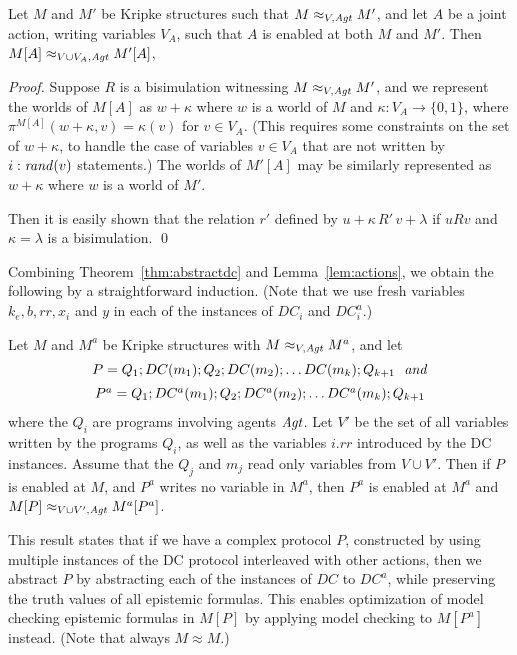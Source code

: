 \documentclass[]{llncs}
\newcommand{\rand}{{\it rand}}
\newcommand{\Agt}{{\it Agt}}
\begin{document}
\begin{lemma} \label{lem:actions} 
Let $M$ and $M'$ be Kripke structures such that $M\approx_{V,\Agt} M'$, and 
let $A$ be a joint action, writing variables $V_A$, such that $A$ is enabled at both $M$ and $M'$. 
Then $M[A] \approx_{V\cup V_A,\Agt} M'[A]$,
\end{lemma} 
\begin{proof} 
Suppose $R$ is a bisimulation witnessing $M\approx_{V,\Agt} M'$, 
and we represent the worlds of $M[A]$
as $w+\kappa$ where $w$ is a  world of $M$ 
and $\kappa: V_A \rightarrow \{0,1\}$, where 
$\pi^{M[A]}(w + \kappa,v) =  \kappa(v)$ for $v\in V_A$. 
(This requires some constraints on the set of $w+\kappa$, to handle the case of 
variables $v\in V_A$ that are not written by $i:\rand(v)$ statements.) 
The worlds of $M'[A]$ may be similarly represented as $w+\kappa$ where $w$ is a world of $M'$. 

Then it is easily shown that the  relation $r'$ defined by 
$u+\kappa \,R'\, v+\lambda$ if $uRv$ and $\kappa = \lambda$ 
is a bisimulation.  \qed
\end{proof} 


Combining Theorem~\ref{thm:abstractdc} and Lemma~\ref{lem:actions}, we obtain the following
by a straightforward induction.
(Note that we 
use fresh variables  
$k_e, b, rr, x_i$ and $y$ in each of the instances of $DC_i$ and $DC^a_i$.)

\begin{theorem} \label{thm:main} 
Let $M$ and $M^a$ be Kripke structures with $M\approx_{V,\Agt} M^a$, and 
let   
$$\begin{array}{c}
P= Q_1; DC(m_1); Q_2 ;  DC(m_2); \ldots  DC(m_k); Q_{k+1}~~{\it and} \\[5pt] 
P^a = Q_1; DC^a(m_1); Q_2 ;  DC^a(m_2); \ldots  DC^a(m_k); Q_{k+1}
\end{array}$$
where the $Q_i$ are programs involving agents $\Agt$. 
Let  $V'$ be the set of all variables written by the programs $Q_i$, 
as well as the variables $i.rr$ introduced by the DC instances.  Assume that 
the $Q_j$ and $m_j$ read only variables from $V\cup V'$. 
Then if $P$ is enabled at $M$, and $P^a$ writes no variable in $M^a$,  then 
$P^a$ is enabled at $M^a$ and $M[P]\approx_{V\cup V',\Agt} M^a[P^a]$. 
\end{theorem} 

This result states that if we have a complex protocol $P$, constructed by using 
multiple instances of the DC protocol interleaved with other actions, 
then we abstract $P$ by abstracting each of the instances of $DC$ to $DC^a$, 
while preserving the truth values of all epistemic formulas.  This enables 
optimization of model checking epistemic formulas in $M[P]$ by 
applying model checking to $M[P^a]$ instead.  (Note that always $M \approx M$.) 
\end{document}

